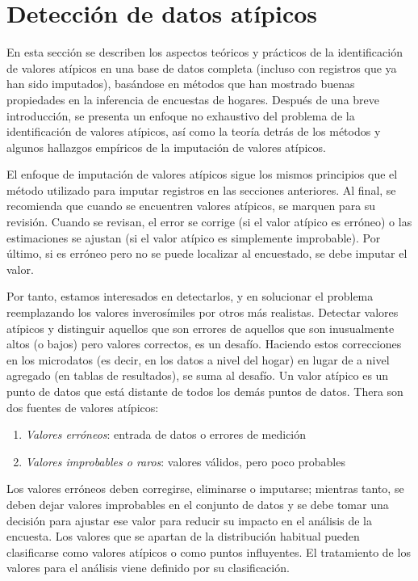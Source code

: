 \documentclass[
  10pt,
  spanish,
]{book}
\providecommand{\tightlist}{%
  \setlength{\itemsep}{0pt}\setlength{\parskip}{0pt}}
\begin{document}
\hypertarget{detecciuxf3n-de-datos-atuxedpicos}{%
\chapter{Detección de datos atípicos}\label{detecciuxf3n-de-datos-atuxedpicos}}

En esta sección se describen los aspectos teóricos y prácticos de la identificación de valores atípicos en una base de datos completa (incluso con registros que ya han sido imputados), basándose en métodos que han mostrado buenas propiedades en la inferencia de encuestas de hogares. Después de una breve introducción, se presenta un enfoque no exhaustivo del problema de la identificación de valores atípicos, así como la teoría detrás de los métodos y algunos hallazgos empíricos de la imputación de valores atípicos.

El enfoque de imputación de valores atípicos sigue los mismos principios que el método utilizado para imputar registros en las secciones anteriores. Al final, se recomienda que cuando se encuentren valores atípicos, se marquen para su revisión. Cuando se revisan, el error se corrige (si el valor atípico es erróneo) o las estimaciones se ajustan (si el valor atípico es simplemente improbable). Por último, si es erróneo pero no se puede localizar al encuestado, se debe imputar el valor.

Por tanto, estamos interesados en detectarlos, y
en solucionar el problema reemplazando los valores inverosímiles por otros más realistas.
Detectar valores atípicos y distinguir aquellos que son errores de aquellos que
son inusualmente altos (o bajos) pero valores correctos, es un desafío. Haciendo estos
correcciones en los microdatos (es decir, en los datos a nivel del hogar) en lugar de
a nivel agregado (en tablas de resultados), se suma al desafío. Un valor atípico es un punto de datos que está distante de todos los demás puntos de datos. Thera son dos fuentes de valores atípicos:

\begin{enumerate}
\def\labelenumi{\arabic{enumi}.}
\tightlist
\item
  \emph{Valores erróneos}: entrada de datos o errores de medición
\item
  \emph{Valores improbables o raros}: valores válidos, pero poco probables
\end{enumerate}

Los valores erróneos deben corregirse, eliminarse o imputarse; mientras tanto, se deben dejar valores improbables en el conjunto de datos y se debe tomar una decisión para ajustar ese valor para reducir su impacto en el análisis de la encuesta. Los valores que se apartan de la distribución habitual pueden clasificarse como valores atípicos o como puntos influyentes. El tratamiento de los valores para el análisis viene definido por su clasificación.
\end{document}
